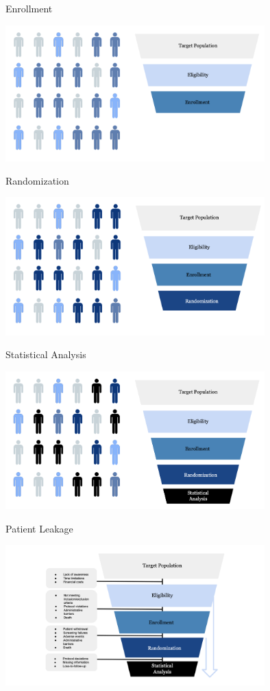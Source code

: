 \documentclass[english]{beamer}\usepackage[]{graphicx}\usepackage[]{xcolor}
\begin{document}
\begin{frame}{Enrollment}

\includegraphics[width=100mm,scale=1]{enrollment.png}


\end{frame}

\begin{frame}{Randomization}

\includegraphics[width=100mm,scale=1]{randomization.png}

\end{frame}

\begin{frame}{Statistical Analysis}

\includegraphics[width=100mm,scale=1]{statanal.png}

\end{frame}



\begin{frame}{Patient Leakage}

\includegraphics[width=100mm,scale=1]{attrition.png}

\end{frame}
\end{document}
